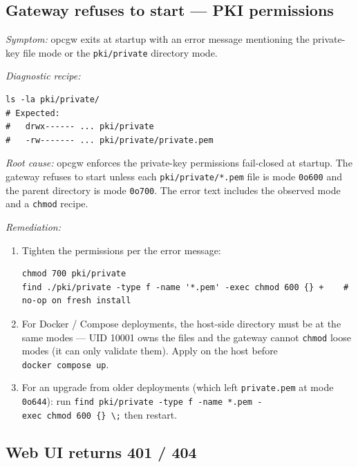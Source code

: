 \subsection{Gateway refuses to start --- PKI permissions}\label{sec-issue-pki-permissions}

\emph{Symptom:} opcgw exits at startup with an error message mentioning the private-key file mode or the \texttt{pki/private} directory mode.

\emph{Diagnostic recipe:}

\begin{lstlisting}
ls -la pki/private/
# Expected:
#   drwx------ ... pki/private
#   -rw------- ... pki/private/private.pem
\end{lstlisting}

\emph{Root cause:} opcgw enforces the private-key permissions fail-closed at startup. The gateway refuses to start unless each \texttt{pki/private/*.pem} file is mode \texttt{0o600} and the parent directory is mode \texttt{0o700}. The error text includes the observed mode and a \texttt{chmod} recipe.

\emph{Remediation:}

\begin{enumerate}
\def\labelenumi{\arabic{enumi}.}
\item
  Tighten the permissions per the error message:

\begin{lstlisting}
chmod 700 pki/private
find ./pki/private -type f -name '*.pem' -exec chmod 600 {} +    # no-op on fresh install
\end{lstlisting}
\item
  For Docker / Compose deployments, the host-side directory must be at the same modes --- UID 10001 owns the files and the gateway cannot \texttt{chmod} loose modes (it can only validate them). Apply on the host before \texttt{docker\ compose\ up}.
\item
  For an upgrade from older deployments (which left \texttt{private.pem} at mode \texttt{0o644}): run \texttt{find\ pki/private\ -type\ f\ -name\ \textquotesingle{}*.pem\textquotesingle{}\ -exec\ chmod\ 600\ \{\}\ \textbackslash{};} then restart.
\end{enumerate}

\subsection{Web UI returns 401 / 404}\label{sec-issue-web-auth-401}

